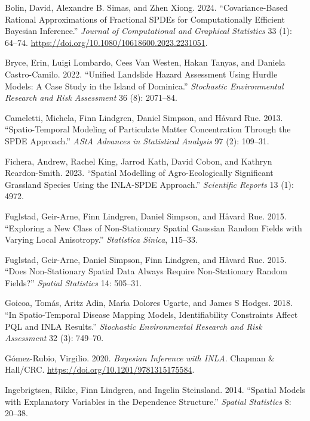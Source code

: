 \documentclass[
  letterpaper,
  DIV=11,
  numbers=noendperiod]{scrartcl}
\newlength{\cslhangindent}
\newenvironment{CSLReferences}[2] %
 {\begin{list}{}{%
  \setlength{\itemindent}{0pt}
  \setlength{\leftmargin}{0pt}
  \setlength{\parsep}{0pt}
  \ifodd #1
   \setlength{\leftmargin}{\cslhangindent}
   \setlength{\itemindent}{-1\cslhangindent}
  \fi
  \setlength{\itemsep}{#2\baselineskip}}}
 {\end{list}}
\begin{document}
\begin{CSLReferences}{1}{1}
Bolin, David, Alexandre B. Simas, and Zhen Xiong. 2024.
{``Covariance-Based Rational Approximations of Fractional SPDEs for
Computationally Efficient Bayesian Inference.''} \emph{Journal of
Computational and Graphical Statistics} 33 (1): 64--74.
\url{https://doi.org/10.1080/10618600.2023.2231051}.

Bryce, Erin, Luigi Lombardo, Cees Van Westen, Hakan Tanyas, and Daniela
Castro-Camilo. 2022. {``Unified Landslide Hazard Assessment Using Hurdle
Models: A Case Study in the Island of Dominica.''} \emph{Stochastic
Environmental Research and Risk Assessment} 36 (8): 2071--84.

Cameletti, Michela, Finn Lindgren, Daniel Simpson, and Håvard Rue. 2013.
{``Spatio-Temporal Modeling of Particulate Matter Concentration Through
the SPDE Approach.''} \emph{AStA Advances in Statistical Analysis} 97
(2): 109--31.

Fichera, Andrew, Rachel King, Jarrod Kath, David Cobon, and Kathryn
Reardon-Smith. 2023. {``Spatial Modelling of Agro-Ecologically
Significant Grassland Species Using the INLA-SPDE Approach.''}
\emph{Scientific Reports} 13 (1): 4972.

Fuglstad, Geir-Arne, Finn Lindgren, Daniel Simpson, and Håvard Rue.
2015. {``Exploring a New Class of Non-Stationary Spatial Gaussian Random
Fields with Varying Local Anisotropy.''} \emph{Statistica Sinica},
115--33.

Fuglstad, Geir-Arne, Daniel Simpson, Finn Lindgren, and Håvard Rue.
2015. {``Does Non-Stationary Spatial Data Always Require Non-Stationary
Random Fields?''} \emph{Spatial Statistics} 14: 505--31.

Goicoa, Tomás, Aritz Adin, Marı́a Dolores Ugarte, and James S Hodges.
2018. {``In Spatio-Temporal Disease Mapping Models, Identifiability
Constraints Affect PQL and INLA Results.''} \emph{Stochastic
Environmental Research and Risk Assessment} 32 (3): 749--70.

Gómez-Rubio, Virgilio. 2020. \emph{Bayesian Inference with {INLA}}.
Chapman \& Hall/CRC. \url{https://doi.org/10.1201/9781315175584}.

Ingebrigtsen, Rikke, Finn Lindgren, and Ingelin Steinsland. 2014.
{``Spatial Models with Explanatory Variables in the Dependence
Structure.''} \emph{Spatial Statistics} 8: 20--38.


\end{CSLReferences}
\end{document}
